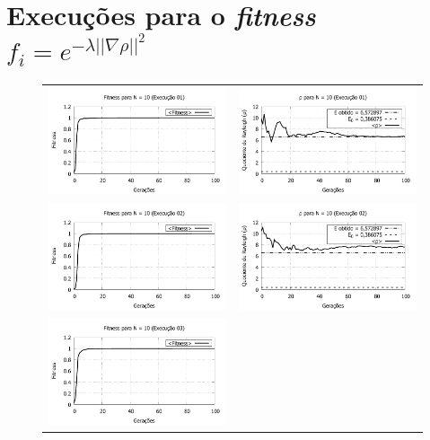 \chapter{Execuções para o \emph{fitness} $f_i = e^{-\lambda||\nabla\rho||^2}$}

\begin{figure}[htbp]
\centering
  \begin{tabular}{@{}cc@{}}
    \includegraphics[width=.45\textwidth]{figs/resultados/fitnessGrad/N10_01_fitness.pdf} &
    \includegraphics[width=.45\textwidth]{figs/resultados/fitnessGrad/N10_01_rho.pdf}   \\
		\includegraphics[width=.45\textwidth]{figs/resultados/fitnessGrad/N10_02_fitness.pdf} &
    \includegraphics[width=.45\textwidth]{figs/resultados/fitnessGrad/N10_02_rho.pdf}   \\
		\includegraphics[width=.45\textwidth]{figs/resultados/fitnessGrad/N10_03_fitness.pdf} &

\end{tabular}
\end{figure}
